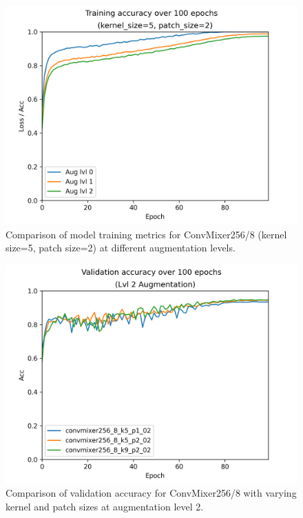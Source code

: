 \documentclass[letterpaper]{article} %
\begin{document}
\begin{figure}
    \includegraphics[width=\linewidth]{training_k5p2.png}
    \caption{Comparison of model training metrics for ConvMixer256/8 (kernel size=5, patch size=2) at different augmentation levels.}
  \end{figure}

  \begin{figure}
    \includegraphics[width=\linewidth]{val_lvl2.png}
    \caption{Comparison of validation accuracy for ConvMixer256/8 with varying kernel and patch sizes at augmentation level 2.}
  \end{figure}

\end{document}
